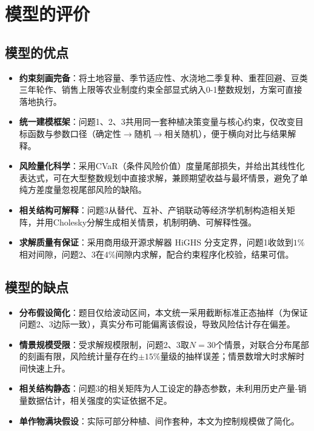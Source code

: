 \section{模型的评价}

\subsection{模型的优点}

\begin{itemize}
	\item \textbf{约束刻画完备}：将土地容量、季节适应性、水浇地二季复种、重茬回避、豆类三年轮作、销售上限等农业制度约束全部显式纳入0-1整数规划，方案可直接落地执行。
	\item \textbf{统一建模框架}：问题1、2、3共用同一套种植决策变量与核心约束，仅改变目标函数与参数口径（确定性$\to$随机$\to$相关随机），便于横向对比与结果解释。
	\item \textbf{风险量化科学}：采用CVaR（条件风险价值）度量尾部损失，并给出其线性化表达式\cite{cvar2000,cvar2002}，可在大型整数规划中直接求解，兼顾期望收益与最坏情景，避免了单纯方差度量忽视尾部风险的缺陷。
	\item \textbf{相关结构可解释}：问题3从替代、互补、产销联动等经济学机制构造相关矩阵，并用Cholesky分解生成相关情景，机制明确、可解释性强。
	\item \textbf{求解质量有保证}：采用商用级开源求解器 HiGHS 分支定界，问题1收敛到$1\%$相对间隙，问题2、3在$4\%$间隙内求解，配合约束程序化校验，结果可信。
\end{itemize}

\subsection{模型的缺点}

\begin{itemize}
	\item \textbf{分布假设简化}：题目仅给波动区间，本文统一采用截断标准正态抽样（为保证问题2、3边际一致），真实分布可能偏离该假设，导致风险估计存在偏差。
	\item \textbf{情景规模受限}：受求解规模限制，问题2、3取$N=30$个情景，对联合分布尾部的刻画有限，风险统计量存在约$\pm15\%$量级的抽样误差；情景数增大时求解时间快速上升。
	\item \textbf{相关结构静态}：问题3的相关矩阵为人工设定的静态参数，未利用历史产量-销量数据估计，相关强度的实证依据不足。
	\item \textbf{单作物满块假设}：实际可部分种植、间作套种，本文为控制规模做了简化。
\end{itemize}

